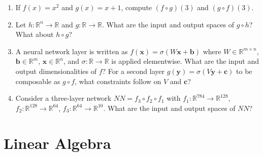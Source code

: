 \documentclass[12pt, a4paper]{scrartcl}
\begin{document}
\begin{enumerate}
\begin{enumerate}
    \item A classmate writes $x_k^{(i)}$ when they mean ``the $i$-th feature of
    the $k$-th sample.'' What is wrong, and why does it matter?

    \item Write an expression for the mean of feature $i$ across all samples
    using $\sum$ notation. How many such means are there in total?

\end{enumerate}


    \item If $f(x) = x^2$ and $g(x) = x + 1$, compute $(f \circ g)(3)$ and
    $(g \circ f)(3)$.

    \item Let $h: \mathbb{R}^n \to \mathbb{R}$ and $g: \mathbb{R} \to
    \mathbb{R}$. What are the input and output spaces of $g \circ h$? What
    about $h \circ g$?

    \item A neural network layer is written as $f(\mathbf{x}) = \sigma(W\mathbf{x}
    + \mathbf{b})$ where $W \in \mathbb{R}^{m \times n}$, $\mathbf{b} \in
    \mathbb{R}^m$, $\mathbf{x} \in \mathbb{R}^n$, and $\sigma: \mathbb{R} \to
    \mathbb{R}$ is applied elementwise. What are the input and output
    dimensionalities of $f$? For a second layer $g(\mathbf{y}) =
    \sigma(V\mathbf{y} + \mathbf{c})$ to be composable as $g \circ f$, what
    constraints follow on $V$ and $\mathbf{c}$?

    \item Consider a three-layer network $NN = f_3 \circ f_2 \circ f_1$ with
    $f_1: \mathbb{R}^{784} \to \mathbb{R}^{128}$, $f_2: \mathbb{R}^{128} \to
    \mathbb{R}^{64}$, $f_3: \mathbb{R}^{64} \to \mathbb{R}^{10}$. What are
    the input and output spaces of $NN$?

\end{enumerate}

\section{Linear Algebra}
\end{document}
